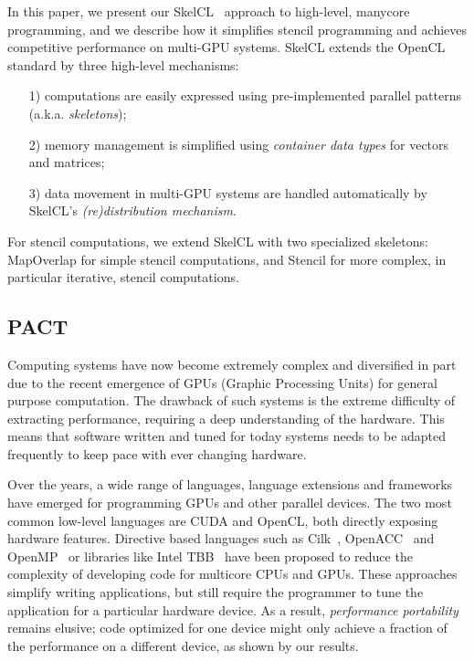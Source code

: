 In this paper, we present our SkelCL~\cite{StG-13b} approach to high-level, manycore programming, and we describe how it simplifies stencil programming and achieves competitive performance on multi-GPU systems.
SkelCL extends the OpenCL standard by three high-level mechanisms:
\begin{itemize}
  \item[1)] computations are easily expressed using pre-implemented parallel patterns (a.k.a. \emph{skeletons});
  \item[2)] memory management is simplified using \emph{container data types} for vectors and matrices;
  \item[3)] data movement in multi-GPU systems are handled automatically by SkelCL's \emph{(re)distribution mechanism}.
\end{itemize}

For stencil computations, we extend SkelCL with two specialized skeletons: MapOverlap for simple stencil computations, and Stencil for more complex, in particular iterative, stencil computations.

\subsection{PACT}
Computing systems have now become extremely complex and diversified in part due to the recent emergence of GPUs (Graphic Processing Units) for general purpose computation.
The drawback of such systems is the extreme difficulty of extracting performance, requiring a deep understanding of the hardware.
This means that software written and tuned for today systems needs to be adapted frequently to keep pace with ever changing hardware.

Over the years, a wide range of languages, language extensions and frameworks have emerged for programming GPUs and other parallel devices. 
The two most common low-level languages are CUDA and OpenCL, both directly exposing hardware features.
Directive based languages such as Cilk~\cite{blumofe95cilk}, Open\-ACC~\cite{reyes12openaccgpu} and OpenMP~\cite{lee09openmp} or libraries like Intel TBB~\cite{reinders07inteltbb} have been proposed to reduce the complexity of developing code for multicore CPUs and GPUs.
These approaches simplify writing applications, but still require the programmer to tune the application for a particular hardware device.
As a result, \emph{performance portability} remains elusive; code optimized for one device might only achieve a fraction of the performance on a different device, as shown by our results.

